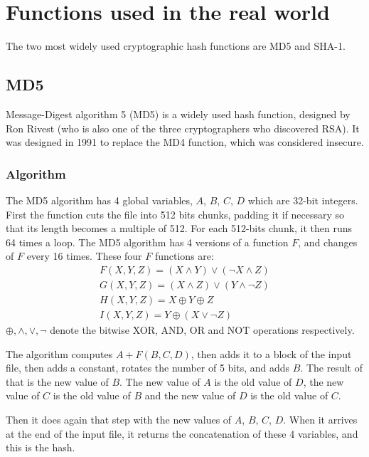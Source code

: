 \documentclass[12pt,a4paper]{article}
\begin{document}
\section{Functions used in the real world}

The two most widely used cryptographic hash functions are MD5 and SHA-1.

\subsection{MD5}

Message-Digest algorithm 5 (MD5) is a widely used hash function, designed by Ron Rivest (who is also one of the three cryptographers who discovered RSA). It was designed in 1991 to replace the MD4 function, which was considered insecure.

\subsubsection{Algorithm}

The MD5 algorithm has 4 global variables, $A$, $B$, $C$, $D$ which are 32-bit integers. First the function cuts the file into 512 bits chunks, padding it if necessary so that its length becomes a multiple of 512.  For each 512-bits chunk, it then runs 64 times a loop. The MD5 algorithm has 4 versions of a function $F$, and changes of $F$ every 16 times. These four $F$ functions are:
\[
\begin{array}{l}
    F(X,Y,Z) = (X\wedge{Y}) \vee (\neg{X} \wedge{Z}) \\
    G(X,Y,Z) = (X\wedge{Z}) \vee (Y \wedge \neg{Z}) \\
    H(X,Y,Z) = X \oplus Y \oplus Z \\
    I(X,Y,Z) = Y \oplus (X \vee \neg{Z}) 
\end{array}
\]
$\oplus, \wedge, \vee, \neg$ denote the bitwise XOR, AND, OR and NOT operations respectively.

The algorithm computes $A + F(B,C,D)$, then adds it to a block of the input file, then adds a constant, rotates the number of 5 bits, and adds $B$. The result of that is the new value of $B$. The new value of $A$ is the old value of $D$, the new value of $C$ is the old value of $B$ and the new value of $D$ is the old value of $C$.

Then it does again that step with the new values of $A$, $B$, $C$, $D$. When it arrives at the end of the input file, it returns the concatenation of these 4 variables, and this is the hash.
\end{document}
